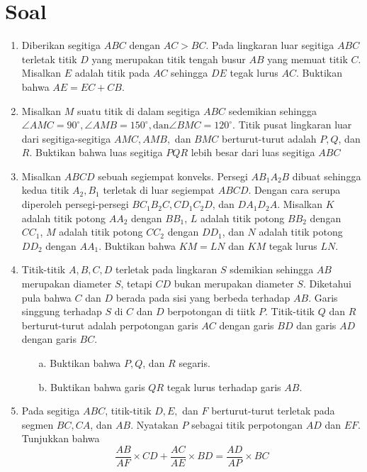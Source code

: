 \documentclass[11pt]{scrartcl}
\begin{document}
	\section{Soal}
	\begin{enumerate}
		\item
		Diberikan segitiga $ABC$ dengan $AC>BC$. Pada lingkaran luar segitiga $ABC$ terletak titik $D$ yang merupakan titik tengah busur $AB$ yang memuat titik $C$. Misalkan $E$ adalah titik pada $AC$ sehingga $DE$ tegak lurus $AC$. Buktikan bahwa $AE=EC+CB$.
		
		\item
		Misalkan $M$ suatu titik di dalam segitiga $ABC$ sedemikian sehingga $\angle AMC = 90 ^{\circ}, \angle AMB = 150 ^{\circ}, \text{dan} \angle BMC = 120 ^\circ$. Titik pusat lingkaran luar dari segitiga-segitiga $AMC, AMB,$ dan $ BMC$ berturut-turut adalah $P,Q$, dan $R$. Buktikan bahwa luas segitiga $PQR$ lebih besar dari luas segitiga $ABC$
		
		\item
		Misalkan $ABCD$ sebuah segiempat konveks. Persegi $AB_1A_2B$ dibuat sehingga kedua titik $A_2,B_1$ terletak di luar segiempat $ABCD$. Dengan cara serupa diperoleh persegi-persegi $BC_1B_2C, CD_1C_2D$, dan $DA_1D_2A$. Misalkan $K$ adalah titik potong $AA_2$ dengan $BB_1$, $L$ adalah titik potong $BB_2$ dengan $CC_1$, $M$ adalah titik potong $CC_2$ dengan $DD_1$, dan $N$ adalah titik potong $DD_2$ dengan $AA_1$. Buktikan bahwa $KM = LN$ dan $KM$ tegak lurus $LN$.
		
		\item
		Titik-titik $A,B,C,D$ terletak pada lingkaran $S$ sdemikian sehingga $AB$ merupakan diameter $S$, tetapi $CD$ bukan merupakan diameter $S$. Diketahui pula bahwa $C$ dan $D$ berada pada sisi yang berbeda terhadap $AB$. Garis singgung terhadap $S$ di $C$ dan $D$ berpotongan di tiitk $P$. Titik-titik $Q$ dan $R$ berturut-turut adalah perpotongan garis $AC$ dengan garis $BD$ dan garis $AD$ dengan garis $BC$.
		\begin{enumerate}
			\item[a.] 
			Buktikan bahwa $P,Q$, dan $R$ segaris.
			\item[b.]
			Buktikan bahwa garis $QR$ tegak lurus terhadap garis $AB$.
		\end{enumerate}
	
		\item
		Pada segitiga $ABC$, titik-titik $D,E,$ dan $F$ berturut-turut terletak pada segmen $BC,CA$, dan $AB$. Nyatakan $P$ sebagai titik perpotongan $AD$ dan $EF$. Tunjukkan bahwa $$\frac{AB}{AF}\times CD + \frac{AC}{AE}\times BD = \frac{AD}{AP} \times BC$$
		

\end{enumerate}
\end{document}
